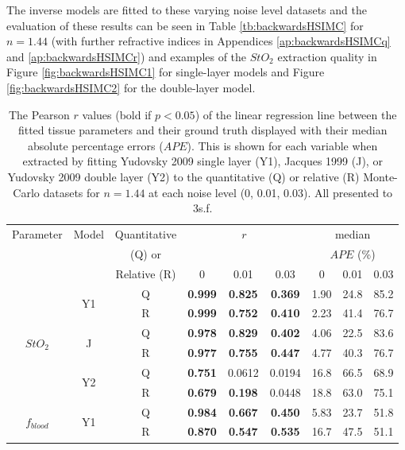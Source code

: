 The inverse models are fitted to these varying noise level datasets and the evaluation of these results can be seen in Table \ref{tb:backwardsHSIMC} for $n=1.44$ (with further refractive indices in Appendices \ref{ap:backwardsHSIMCq} and \ref{ap:backwardsHSIMCr}) and examples of the $StO_2$ extraction quality in Figure \ref{fig:backwardsHSIMC1} for single-layer models and Figure \ref{fig:backwardsHSIMC2} for the double-layer model. 

\begin{table}[h!]
    \centering
    \caption{The Pearson $r$ values (bold if $p<0.05$) of the linear regression line between the fitted tissue parameters and their ground truth displayed with their median absolute percentage errors ($APE$). This is shown for each variable when extracted by fitting Yudovsky 2009 single layer (Y1), Jacques 1999 (J), or Yudovsky 2009 double layer (Y2) to the quantitative (Q) or relative (R) Monte-Carlo datasets for $n=1.44$ at each noise level (0, 0.01, 0.03). All presented to 3s.f.}
    \begin{tabular}{|ccc|ccc|ccc|}
        \hline
        Parameter & Model & Quantitative & \multicolumn{3}{c}{$r$} & \multicolumn{3}{|c|}{median} \\
        & & (Q) or & \multicolumn{3}{c}{} & \multicolumn{3}{|c|}{$APE$ (\%)} \\
        & & Relative (R) & 0 & 0.01 & 0.03 & 0 & 0.01 & 0.03 \\
        \hline
        \multirow{6}{*}{$StO_2$} & \multirow{2}{*}{Y1} & Q & \textbf{0.999} & \textbf{0.825} & \textbf{0.369} & 1.90 & 24.8 & 85.2 \\
        & & R & \textbf{0.999} & \textbf{0.752} & \textbf{0.410} & 2.23 & 41.4 & 76.7 \\
        \cline{2-9}
        & \multirow{2}{*}{J} & Q & \textbf{0.978} & \textbf{0.829} & \textbf{0.402} & 4.06 & 22.5 & 83.6 \\
        & & R & \textbf{0.977} & \textbf{0.755} & \textbf{0.447} & 4.77 & 40.3 & 76.7 \\
        \cline{2-9}
        & \multirow{2}{*}{Y2} & Q & \textbf{0.751} & 0.0612 & 0.0194 & 16.8 & 66.5 & 68.9 \\
        & & R & \textbf{0.679} & \textbf{0.198} & 0.0448 & 18.8 & 63.0 & 75.1 \\
        \hline
        \multirow{6}{*}{$f_{blood}$} & \multirow{2}{*}{Y1} & Q & \textbf{0.984} & \textbf{0.667} & \textbf{0.450} & 5.83 & 23.7 & 51.8\\
        & & R & \textbf{0.870} & \textbf{0.547} & \textbf{0.535} & 16.7 & 47.5 & 51.1\\

\end{tabular}
\end{table}
